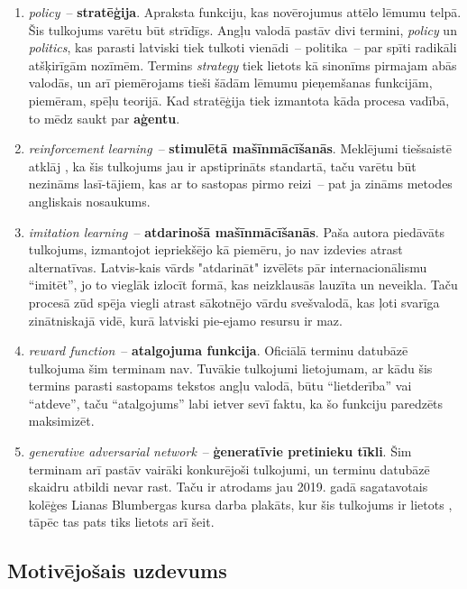 \documentclass[12pt, a4paper]{article}
\numberwithin{equation}{section} %
\begin{document}
\begin{enumerate}
    \item \textit{policy}~-- \textbf{stratēģija}. Apraksta funkciju, kas novērojumus attēlo lēmumu telpā. Šis tulkojums varētu būt strīdīgs. Angļu valodā pastāv divi termini, \textit{policy} un \textit{politics}, kas parasti latviski tiek tulkoti vienādi~-- politika~-- par spīti radikāli atšķirīgām nozīmēm. Termins \textit{strategy} tiek lietots kā sinonīms pirmajam abās valodās, un arī piemērojams tieši šādām lēmumu pieņemšanas funkcijām, piemēram, spēļu teorijā. Kad stratēģija tiek izmantota kāda procesa vadībā, to mēdz saukt par \textbf{aģentu}.
    \item \textit{reinforcement learning}~-- \textbf{stimulētā mašīnmācīšanās}. Meklējumi tiešsaistē atklāj \cite{enc_stim}, ka šis tulkojums jau ir apstiprināts standartā, taču varētu būt nezināms lasī-tājiem, kas ar to sastopas pirmo reizi~-- pat ja zināms metodes angliskais nosaukums.
    \item \textit{imitation learning}~-- \textbf{atdarinošā mašīnmācīšanās}. Paša autora piedāvāts tulkojums, izmantojot iepriekšējo kā piemēru, jo nav izdevies atrast alternatīvas. Latvis-kais vārds "atdarināt" izvēlēts pār internacionālismu ``imitēt'', jo to vieglāk izlocīt formā, kas neizklausās lauzīta un neveikla. Taču procesā zūd spēja viegli atrast sākotnējo vārdu svešvalodā, kas ļoti svarīga zinātniskajā vidē, kurā latviski pie-ejamo resursu ir maz.
    \item \textit{reward function}~-- \textbf{atalgojuma funkcija}. Oficiālā terminu datubāzē tulkojuma šim terminam nav. Tuvākie tulkojumi lietojumam, ar kādu šis termins parasti sastopams tekstos angļu valodā, būtu ``lietderība'' vai ``atdeve'', taču ``atalgojums'' labi ietver sevī faktu, ka šo funkciju paredzēts maksimizēt.
    \item \textit{generative adversarial network}~-- \textbf{ģeneratīvie pretinieku tīkli}. Šim terminam arī pastāv vairāki konkurējoši tulkojumi, un terminu datubāzē skaidru atbildi nevar rast. Taču ir atrodams jau 2019. gadā sagatavotais kolēģes Lianas Blumbergas kursa darba plakāts, kur šis tulkojums ir lietots \cite{GAN}, tāpēc tas pats tiks lietots arī šeit.
\end{enumerate}

\subsection*{Motivējošais uzdevums} %
\end{document}
